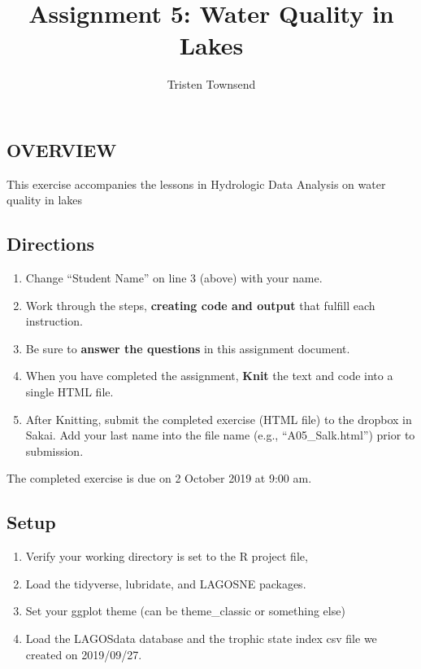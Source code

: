 \documentclass[]{article}
\title{Assignment 5: Water Quality in Lakes}
\author{Tristen Townsend}
\date{}
\providecommand{\tightlist}{%
  \setlength{\itemsep}{0pt}\setlength{\parskip}{0pt}}
\begin{document}
\maketitle

\hypertarget{overview}{%
\subsection{OVERVIEW}\label{overview}}

This exercise accompanies the lessons in Hydrologic Data Analysis on
water quality in lakes

\hypertarget{directions}{%
\subsection{Directions}\label{directions}}

\begin{enumerate}
\def\labelenumi{\arabic{enumi}.}
\tightlist
\item
  Change ``Student Name'' on line 3 (above) with your name.
\item
  Work through the steps, \textbf{creating code and output} that fulfill
  each instruction.
\item
  Be sure to \textbf{answer the questions} in this assignment document.
\item
  When you have completed the assignment, \textbf{Knit} the text and
  code into a single HTML file.
\item
  After Knitting, submit the completed exercise (HTML file) to the
  dropbox in Sakai. Add your last name into the file name (e.g.,
  ``A05\_Salk.html'') prior to submission.
\end{enumerate}

The completed exercise is due on 2 October 2019 at 9:00 am.

\hypertarget{setup}{%
\subsection{Setup}\label{setup}}

\begin{enumerate}
\def\labelenumi{\arabic{enumi}.}
\tightlist
\item
  Verify your working directory is set to the R project file,
\item
  Load the tidyverse, lubridate, and LAGOSNE packages.
\item
  Set your ggplot theme (can be theme\_classic or something else)
\item
  Load the LAGOSdata database and the trophic state index csv file we
  created on 2019/09/27.
\end{enumerate}
\end{document}
